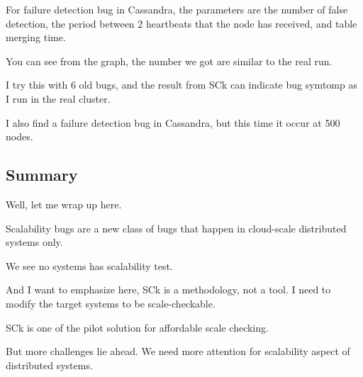 For failure detection bug in Cassandra, the parameters are the number of false
detection, the period between 2 heartbeats that the node has received, and
table merging time.

You can see from the graph, the number we got are similar to the real run.

I try this with 6 old bugs, and the result from SCk can indicate bug symtomp as
I run in the real cluster.

I also find a failure detection bug in Cassandra, but this time it occur at 500
nodes.

\subsection{Summary}

Well, let me wrap up here.

Scalability bugs are a new class of bugs that happen in cloud-scale distributed
systems only.

We see no systems has scalability test.

And I want to emphasize here, SCk is a methodology, not a tool. I need to modify
the target systems to be scale-checkable.

SCk is one of the pilot solution for affordable scale checking.

But more challenges lie ahead. We need more attention for scalability aspect of
distributed systems.

